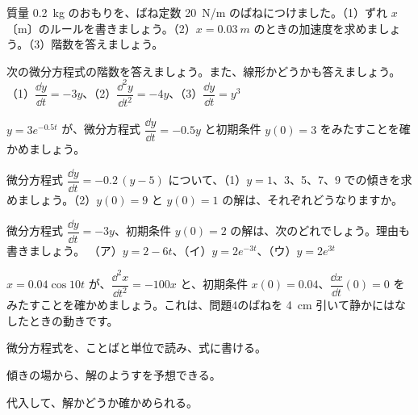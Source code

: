 \bkproblem 質量 \qty{0.2}{kg} のおもりを、ばね定数 \qty{20}{N/m} のばねにつけました。（1）ずれ $x$〔m〕のルールを書きましょう。（2）$x=\qty{0.03}{m}$ のときの加速度を求めましょう。（3）階数を答えましょう。

\bkproblem 次の微分方程式の階数を答えましょう。また、線形かどうかも答えましょう。\newline
（1）$\dfrac{\dd y}{\dd t}=-3y$、（2）$\dfrac{\dd^2y}{\dd t^2}=-4y$、（3）$\dfrac{\dd y}{\dd t}=y^3$

\bkproblem $y=3e^{-0.5t}$ が、微分方程式 $\dfrac{\dd y}{\dd t}=-0.5y$ と初期条件 $y(0)=3$ をみたすことを確かめましょう。


\bkproblem 微分方程式 $\dfrac{\dd y}{\dd t}=-0.2\,(y-5)$ について、（1）$y=1$、3、5、7、9 での傾きを求めましょう。（2）$y(0)=9$ と $y(0)=1$ の解は、それぞれどうなりますか。

\bkproblem 微分方程式 $\dfrac{\dd y}{\dd t}=-3y$、初期条件 $y(0)=2$ の解は、次のどれでしょう。理由も書きましょう。\newline
（ア）$y=2-6t$、（イ）$y=2e^{-3t}$、（ウ）$y=2e^{3t}$

\bkproblem $x=0.04\cos10t$ が、$\dfrac{\dd^2x}{\dd t^2}=-100x$ と、初期条件 $x(0)=0.04$、$\dfrac{\dd x}{\dd t}(0)=0$ をみたすことを確かめましょう。これは、問題4のばねを \qty{4}{cm} 引いて静かにはなしたときの動きです。

\begin{furikaeri}
\begin{checklist}
\item 微分方程式を、ことばと単位で読み、式に書ける。
\item 傾きの場から、解のようすを予想できる。
\item 代入して、解かどうか確かめられる。
\end{checklist}
\end{furikaeri}

